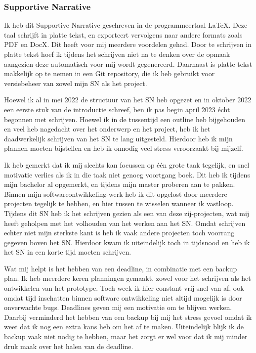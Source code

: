 
\subsubsection*{Supportive Narrative}
Ik heb dit Supportive Narrative geschreven in de programmeertaal LaTeX. Deze taal schrijft in platte tekst, en exporteert vervolgens naar andere formats zoals PDF en DocX. Dit heeft voor mij meerdere voordelen gehad. Door te schrijven in platte tekst hoef ik tijdens het schrijven niet na te denken over de opmaak aangezien deze automatisch voor mij wordt gegenereerd. Daarnaast is platte tekst makkelijk op te nemen in een Git repository, die ik heb gebruikt voor versiebeheer van zowel mijn SN als het project.

Hoewel ik al in mei 2022 de structuur van het SN heb opgezet en in oktober 2022 een eerste stuk van de introductie schreef, ben ik pas begin april 2023 écht begonnen met schrijven. Hoewel ik in de tussentijd een outline heb bijgehouden en veel heb nagedacht over het onderwerp en het project, heb ik het daadwerkelijk schrijven van het SN te lang uitgesteld. Hierdoor heb ik mijn plannen moeten bijstellen en heb ik onnodig veel stress veroorzaakt bij mijzelf. 

Ik heb gemerkt dat ik mij slechts kan focussen op één grote taak tegelijk, en snel motivatie verlies als ik in die taak niet genoeg voortgang boek. Dit heb ik tijdens mijn bachelor al opgemerkt, en tijdens mijn master proberen aan te pakken. Binnen mijn softwareontwikkeling-werk heb ik dit opgelost door meerdere projecten tegelijk te hebben, en hier tussen te wisselen wanneer ik vastloop. Tijdens dit SN heb ik het schrijven gezien als een van deze zij-projecten, wat mij heeft geholpen met het volhouden van het werken aan het SN. Omdat schrijven echter niet mijn sterkste kant is heb ik vaak andere projecten toch voorrang gegeven boven het SN. Hierdoor kwam ik uiteindelijk toch in tijdsnood en heb ik het SN in een korte tijd moeten schrijven.

Wat mij helpt is het hebben van een deadline, in combinatie met een backup plan. Ik heb meerdere keren planningen gemaakt, zowel voor het schrijven als het ontwikkelen van het prototype. Toch week ik hier constant vrij snel van af, ook omdat tijd inschatten binnen software ontwikkeling niet altijd mogelijk is door onverwachte bugs. Deadlines geven mij een motivatie om te blijven werken. Daarbij verminderd het hebben van een backup bij mij het stress gevoel omdat ik weet dat ik nog een extra kans heb om het af te maken. Uiteindelijk blijk ik de backup vaak niet nodig te hebben, maar het zorgt er wel voor dat ik mij minder druk maak over het halen van de deadline.

